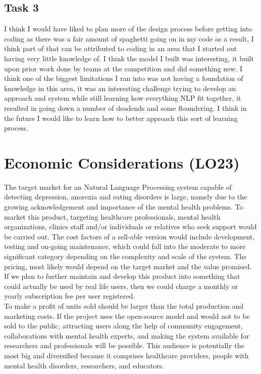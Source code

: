 \documentclass{article}
\begin{document}
\subsection{Task 3}

I think I would have liked to plan more of the design process before getting into coding as there was a fair amount of spaghetti going on in my code as a result, I think part of that can be attributed to coding in an area that I started out having very little knowledge of. I think the model I built was interesting, it built upon prior work done by teams at the competition and did something new. I think one of the biggest limitations I ran into was not having a foundation of knowledge in this area, it was an interesting challenge trying to develop an approach and system while still learning how everything NLP fit together, it resulted in going down a number of deadends and some floundering. I think in the future I would like to learn how to better approach this sort of learning process.

\section{Economic Considerations (LO23)}

The target market  for an Natural Language Processing system capable of detecting depression, anorexia and eating disorders is large, namely due to the growing acknowledgement and importance of the mental health problems. To market this product, targeting healthcare professionals, mental health organizations, clinics staff and/or individuals or relatives who seek support would be carried out. The cost factors of a sell-able version would include development, testing and on-going maintenance, which could fall into the moderate to more significant category depending on the complexity and scale of the system. The pricing, most likely would depend on the target market and the value promised.  If we plan to further maintain and develop this product into something that could actually be used by real life users, then we could charge a monthly or yearly subscription fee per user registered. \\ To make a profit of units sold should be larger than the total production and marketing costs. If the project uses the open-source model and would not to be sold to the public, attracting users along the help of community engagement, collaborations with mental health experts, and making the system available for researchers and professionals will be possible. This audience is potentially the most big and diversified because it comprises healthcare providers, people with mental health disorders, researchers, and educators.
\end{document}
